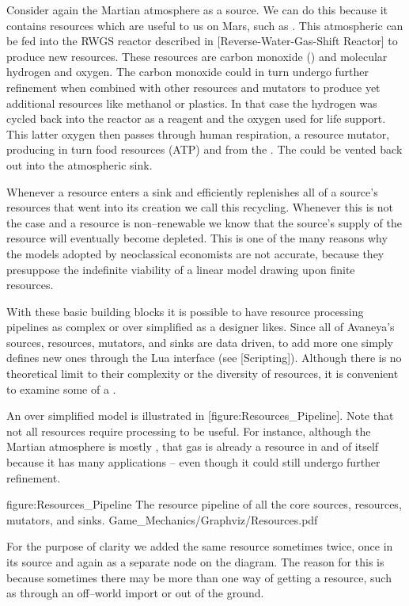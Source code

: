 Consider again the Martian atmosphere as a source. We can do this because it contains resources which are useful to us on Mars, such as . This atmospheric  can be fed into the RWGS reactor described in [Reverse-Water-Gas-Shift Reactor] to produce new resources. These resources are carbon monoxide () and molecular hydrogen and oxygen. The carbon monoxide could in turn undergo further refinement when combined with other resources and mutators to produce yet additional resources like methanol or plastics. In that case the hydrogen was cycled back into the reactor as a reagent and the oxygen used for life support. This latter oxygen then passes through human respiration, a resource mutator, producing in turn food resources (ATP) and  from the . The  could be vented back out into the atmospheric sink.

Whenever a resource enters a sink and efficiently replenishes all of a source's resources that went into its creation we call this recycling. Whenever this is not the case and a resource is non--renewable we know that the source's supply of the resource will eventually become depleted. This is one of the many reasons why the models adopted by neoclassical economists are not accurate, because they presuppose the indefinite viability of a linear model drawing upon finite resources.

With these basic building blocks it is possible to have resource processing pipelines as complex or over simplified as a designer likes. Since all of Avaneya's sources, resources, mutators, and sinks are data driven, to add more one simply defines new ones through the Lua interface (see [Scripting]). Although there is no theoretical limit to their complexity or the diversity of resources, it is convenient to examine some of a .

An over simplified model is illustrated in [figure:Resources_Pipeline]. Note that not all resources require processing to be useful. For instance, although the Martian atmosphere is mostly , that gas is already a resource in and of itself because it has many applications -- even though it could still undergo further refinement.

\FullPageDiagram
    {figure:Resources_Pipeline}
    {The resource pipeline of all the core sources, resources, mutators, and sinks.}
    {Game_Mechanics/Graphviz/Resources.pdf}

For the purpose of clarity we added the same resource sometimes twice, once in its source and again as a separate node on the diagram. The reason for this is because sometimes there may be more than one way of getting a resource, such as through an off--world import or out of the ground.

